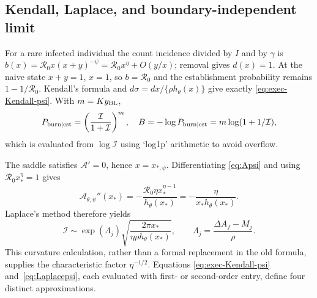 \documentclass[11pt,a4paper]{article}
\newcommand{\Rzero}{\mathcal R_0}
\begin{document}
\subsection{Kendall, Laplace, and boundary-independent limit}
For a rare infected individual the count incidence divided by $I$ and by
$\gamma$ is
$b(x)=\Rzero x(x+y)^{-\psi}=\Rzero x^\eta+O(y/x)$; removal gives $d(x)=1$.
At the naive state $x+y=1$, $x=1$, so $b=\Rzero$ and the establishment
probability remains $1-1/\Rzero$.  Kendall's formula and
$d\sigma=dx/\{\rho h_\theta(x)\}$ give exactly
\eqref{eq:exec-Kendall-psi}.  With $m=Ky_{\rm BL}$,
\[
 P_{\rm burn\mid est}=\left(\frac{\mathcal I}{1+\mathcal I}\right)^m,
 \quad
 B=-\log P_{\rm burn\mid est}=m\log(1+1/\mathcal I),
\]
which is evaluated from $\log\mathcal I$ using `log1p' arithmetic to avoid
overflow.

The saddle satisfies $\mathcal A'=0$, hence $x=x_{*,\psi}$.  Differentiating
\eqref{eq:Apsi} and using $\Rzero x_*^\eta=1$ gives
\begin{equation}
 \mathcal A_{\theta,\psi}''(x_*)
 =-\frac{\Rzero\eta x_*^{\eta-1}}{h_\theta(x_*)}
 =-\frac\eta{x_*h_\theta(x_*)}.
 \label{eq:A2saddlepsi}
\end{equation}
Laplace's method therefore yields
\begin{equation}
 \mathcal I\sim
 \exp(\Lambda_j)
 \sqrt{\frac{2\pi x_*}{\eta\rho h_\theta(x_*)}},\qquad
 \Lambda_j=\frac{\Delta A_f-M_j}{\rho}.
 \label{eq:Laplacepsi}
\end{equation}
This curvature calculation, rather than a formal replacement in the old
formula, supplies the characteristic factor $\eta^{-1/2}$.  Equations
\eqref{eq:exec-Kendall-psi} and~\eqref{eq:Laplacepsi}, each evaluated with
first- or second-order entry, define four distinct approximations.
\end{document}
